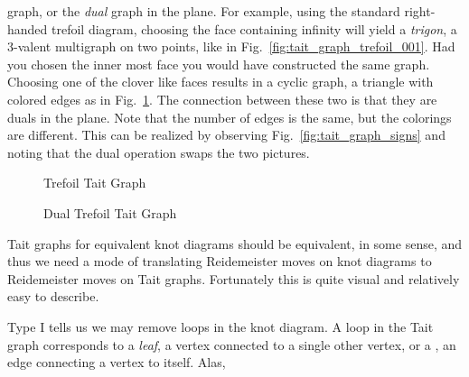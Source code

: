 \documentclass{article}
\theoremstyle{plain}
\begin{document}
        graph, or the \textit{dual} graph in the plane. For example, using the
        standard right-handed trefoil diagram, choosing the face containing
        infinity will yield a \textit{trigon}, a 3-valent multigraph on two
        points, like in Fig.~\ref{fig:tait_graph_trefoil_001}. Had you chosen
        the inner most face you would have constructed the same graph. Choosing
        one of the clover like faces results in a cyclic graph, a triangle with
        colored edges as in Fig.~\ref{fig:tait_graph_trefoil_002}. The
        connection between these two is that they are duals in the plane.
        Note that the number of edges is the same, but the colorings are
        different. This can be realized by observing
        Fig.~\ref{fig:tait_graph_signs} and noting that the dual operation
        swaps the two pictures.
        \begin{figure}
            \centering
            \begin{minipage}[b]{0.49\textwidth}
                \centering
                \vspace{2em}
                \caption{Trefoil Tait Graph}
                \label{fig:tait_graph_trefoil_001}
            \end{minipage}
            \hfill
            \begin{minipage}[b]{0.49\textwidth}
                \centering
                \caption{Dual Trefoil Tait Graph}
                \label{fig:tait_graph_trefoil_002}
            \end{minipage}
        \end{figure}
        \par\hfill\par
        Tait graphs for equivalent knot diagrams should be equivalent,
        in some sense, and thus
        we need a mode of translating Reidemeister moves on knot diagrams to
        Reidemeister moves on Tait graphs. Fortunately this is quite visual and
        relatively easy to describe.
        \par\hfill\par
        Type I tells us we may remove loops in the knot diagram.
        A loop in the Tait graph
        corresponds to a \textit{leaf}, a vertex connected to a single other
        vertex, or a , an edge connecting a vertex to itself. Alas,
\end{document}

